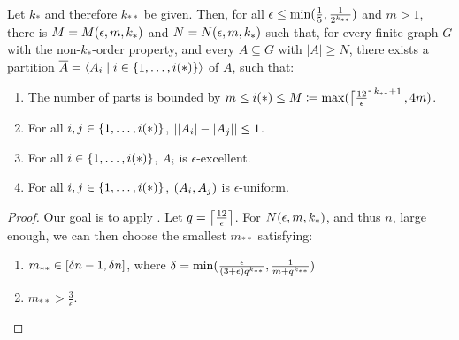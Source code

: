     \begin{theorem}[Theorem 5.18] \label{thm:minimal_conditions_for_excellent_partitions}
        Let $k_*$ and therefore $k_{**}$ be given.
        Then, for all $\epsilon \leq \min ( \frac{1}{5}, \frac{1}{2^{k_{**}}} )$ and $m > 1$, there is $M = M( \epsilon, m, k_* )$
        and $N = N( \epsilon, m, k_* )$ such that, for every finite graph $G$ with the non-$k_{*}$-order property, and
        every $A \subseteq G$ with $|A| \geq N$, there exists a partition $\overline{A} = \left< A_i \mid i \in \{ 1, \dots, i(*) \} \right>$
        of $A$, such that:
        \begin{enumerate}
            \item \label{itm:minimal_conditions_for_excellent_partitions.0} The number of parts is bounded by
                $m \leq i(*) \leq M \coloneqq \max ( \left\lceil \frac{12}{\epsilon} \right\rceil^{k_{**}+1}, 4m )$.
            \item \label{itm:minimal_conditions_for_excellent_partitions.1}
                For all $i, j \in \{ 1, \dots, i(*) \}$, $| | A_i |- | A_j | | \leq 1$.
            \item \label{itm:minimal_conditions_for_excellent_partitions.2}
                For all $i \in \{ 1, \dots, i(*) \}$, $A_i$ is $\epsilon$-excellent.
            \item \label{itm:minimal_conditions_for_excellent_partitions.3}
                For all $i, j \in \{ 1, \dots, i(*) \}$, $( A_i, A_j )$ is $\epsilon$-uniform.  
        \end{enumerate}
        \begin{proof}
            Our goal is to apply .
            Let $q = \left\lceil \frac{12}{\epsilon} \right\rceil$.
            For $N( \epsilon, m, k_* )$, and thus $n$, large enough, we can then choose the smallest $m_{**}$ satisfying:
            \begin{enumerate}[label=(\alph*), ref=\alph*]
                \item \label{itm:minimal_conditions_for_excellent_partitions.a} $m_{**} \in [ \delta n -1, \delta n ]$, where
                    $\delta = \min ( \frac{\epsilon}{( 3 + \epsilon ) q^{k_{**}}}, \frac{1}{m + q^{k_{**}}} )$
                \item \label{itm:minimal_conditions_for_excellent_partitions.b} $m_{**} > \frac{3}{\epsilon}$.

\end{enumerate}
\end{proof}
\end{theorem}
